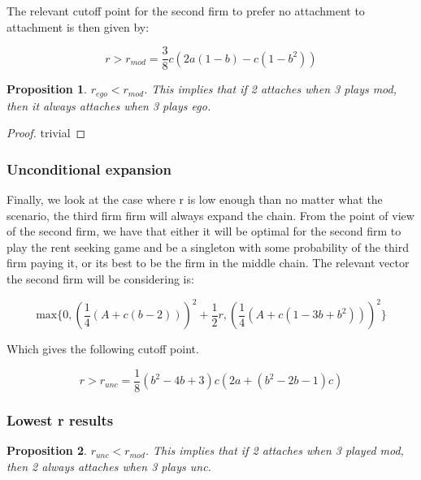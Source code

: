 \documentclass{article}
\newtheorem{proposition}{Proposition}
\begin{document}
The relevant cutoff point for the second firm to prefer no attachment to attachment is then given by:

\begin{equation*}
r>r_{mod}= \frac{3}{8} c \left(2 a (1-b)-c(1-b^2)\right)    
\end{equation*}

\begin{proposition}\label{egomod}
$r_{ego}<r_{mod}$. This implies that if 2 attaches when 3 plays mod, then it always attaches when 3 plays ego.   
\end{proposition}

\begin{proof}
trivial
\end{proof}

\subsubsection{Unconditional expansion } Finally, we look at the case where r is low enough than no matter what the scenario, the third firm firm will always expand the chain. From the point of view of the second firm, we have that either it will be optimal for the second firm to play the rent seeking game and be a singleton with some probability of the third firm paying it, or its best to be the firm in the middle chain. The relevant vector the second firm will be considering is: 

\begin{equation*}
\text{max} \{ 
0, \left(\frac{1}{4}(A+ c(b-2)) \right)^2+\frac{1}{2}r, \left(\frac{1}{4}(A+c(1-3b+b^2)) \right)^2
\}
\end{equation*}

Which gives the following cutoff point. 

\begin{equation*}
r>r_{unc}=\frac{1}{8} \left(b^2-4 b+3\right) c \left(2 a+\left(b^2-2 b-1\right) c\right)
\end{equation*}

\subsubsection{Lowest r results}

\begin{proposition}\label{uncmod}
$r_{unc}<r_{mod}$. This implies that if 2 attaches when 3 played mod, then 2 always attaches when 3 plays unc. 
\end{proposition}
\end{document}
